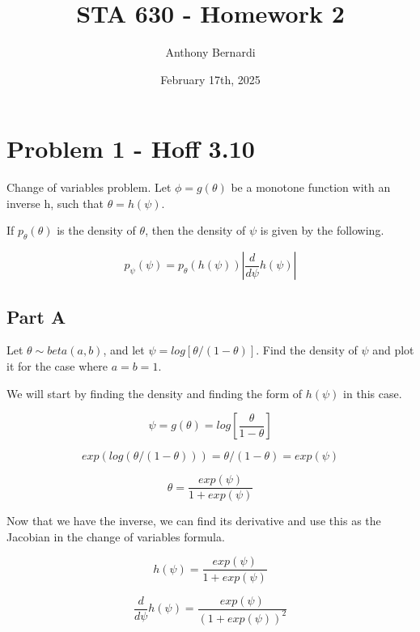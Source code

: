 \documentclass[12pt, letterpaper]{article}
\title{STA 630 - Homework 2}
\author{Anthony Bernardi}
\date{February 17th, 2025}
\begin{document}
\maketitle

\section{Problem 1 - Hoff 3.10}

Change of variables problem. Let $\phi = g(\theta)$ be a monotone function with an inverse h, such that $\theta =h(\psi)$. 

If $p_{\theta}(\theta)$ is the density of $\theta$, then the density of $\psi$ is given by the following. 

\begin{equation}
p_{\psi}(\psi) = p_{\theta}(h(\psi))\left|\frac{d}{d\psi}h(\psi)\right| 
\end{equation} 

\subsection{Part A} 

Let $\theta \sim beta(a,b)$, and let $\psi = log[\theta/(1-\theta)]$. Find the density of $\psi$ and plot it for the case where $a = b = 1$. 

We will start by finding the density and finding the form of $h(\psi)$ in this case. 

\begin{equation}
\psi = g(\theta) = log\left[\frac{\theta}{1-\theta}\right] 
\end{equation} 

\begin{equation} 
exp(log(\theta/(1-\theta))) = \theta/(1-\theta) = exp(\psi) 
\end{equation} 

\begin{equation} 
\theta = \frac{exp(\psi)}{1+exp(\psi)} 
\end{equation} 

Now that we have the inverse, we can find its derivative and use this as the Jacobian in the change of variables formula. 

\begin{equation} 
h(\psi) = \frac{exp(\psi)}{1+exp(\psi)} 
\end{equation} 

\begin{equation} 
\frac{d}{d\psi}h(\psi) = \frac{exp(\psi)}{(1+exp(\psi))^2} 
\end{equation} 
\end{document}
